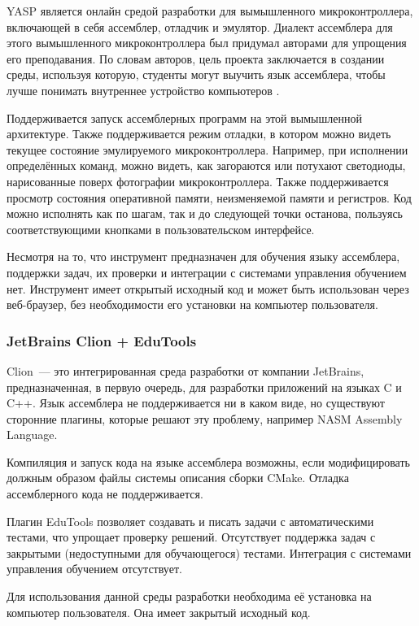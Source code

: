 \documentclass[a4paper,article,14pt]{extarticle}
\begin{document}
YASP\cite{yasp} является онлайн средой разработки для вымышленного микроконтроллера, включающей в себя ассемблер, отладчик и эмулятор. Диалект ассемблера для этого вымышленного микроконтроллера был придумал авторами для упрощения его преподавания. По словам авторов, цель проекта заключается в создании среды, используя которую, студенты могут выучить язык ассемблера, чтобы лучше понимать внутреннее устройство компьютеров \cite{yasp}.

Поддерживается запуск ассемблерных программ на этой вымышленной архитектуре. Также поддерживается режим отладки, в котором можно видеть текущее состояние эмулируемого микроконтроллера. Например, при исполнении определённых команд, можно видеть, как загораются или потухают светодиоды, нарисованные поверх фотографии микроконтроллера. Также поддерживается просмотр состояния оперативной памяти, неизменяемой памяти и регистров. Код можно исполнять как по шагам, так и до следующей точки останова, пользуясь соответствующими кнопками в пользовательском интерфейсе.

Несмотря на то, что инструмент предназначен для обучения языку ассемблера, поддержки задач, их проверки и интеграции с системами управления обучением нет. Инструмент имеет открытый исходный код и может быть использован через веб-браузер, без необходимости его установки на компьютер пользователя.

\subsubsection{JetBrains Clion + EduTools}

Clion\cite{clion}~--- это интегрированная среда разработки от компании JetBrains, предназначенная, в первую очередь, для разработки приложений на языках C и C++. Язык ассемблера не поддерживается ни в каком виде, но существуют сторонние плагины, которые решают эту проблему, например NASM Assembly Language\cite{nasmplugin}.

Компиляция и запуск кода на языке ассемблера возможны, если модифицировать должным образом файлы системы описания сборки CMake. Отладка ассемблерного кода не поддерживается.

Плагин EduTools\cite{edutools} позволяет создавать и писать задачи с автоматическими тестами, что упрощает проверку решений. Отсутствует поддержка задач с закрытыми (недоступными для обучающегося) тестами. Интеграция с системами управления обучением отсутствует.

Для использования данной среды разработки необходима её установка на компьютер пользователя. Она имеет закрытый исходный код.
\end{document}

